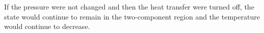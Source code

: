 If the pressure were not changed and then the heat transfer were turned off, the state would continue to remain in the two-component region and the temperature would continue to decrease.